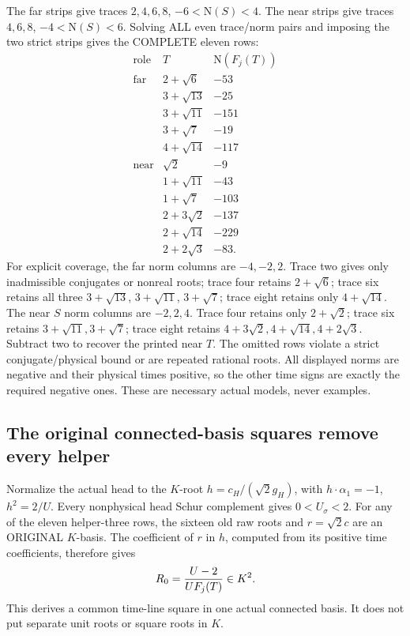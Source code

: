 The far strips give traces \(2,4,6,8\),
\(-6<\mathrm N(S)<4\).
The near strips give traces \(4,6,8\),
\(-4<\mathrm N(S)<6\).
Solving ALL even trace/norm pairs and imposing
the two strict strips gives the COMPLETE eleven rows:
\[
\begin{array}{c|c|r}
 \text{role}&T&\mathrm N(F_j(T))\\ \hline
 \text{far}&2+\sqrt6&-53\\
 &3+\sqrt{13}&-25\\
 &3+\sqrt{11}&-151\\
 &3+\sqrt7&-19\\
 &4+\sqrt{14}&-117\\ \hline
 \text{near}&\sqrt2&-9\\
 &1+\sqrt{11}&-43\\
 &1+\sqrt7&-103\\
 &2+3\sqrt2&-137\\
 &2+\sqrt{14}&-229\\
 &2+2\sqrt3&-83 .
\end{array}
\]
For explicit coverage, the far norm columns are
\(-4,-2,2\).
Trace two gives only inadmissible conjugates or
nonreal roots; trace four retains \(2+\sqrt6\);
trace six retains all three \(3+\sqrt{13}\),
\(3+\sqrt{11}\), \(3+\sqrt7\);
trace eight retains only \(4+\sqrt{14}\).
The near \(S\) norm columns are \(-2,2,4\).
Trace four retains only \(2+\sqrt2\);
trace six retains \(3+\sqrt{11},3+\sqrt7\);
trace eight retains \(4+3\sqrt2,4+\sqrt{14},4+2\sqrt3\).
Subtract two to recover the printed near \(T\).
The omitted rows violate a strict conjugate/physical
bound or are repeated rational roots.
All displayed norms are negative and their physical
times positive, so the other time signs are exactly
the required negative ones.
These are necessary actual models, never examples.

\subsection{The original connected-basis squares remove every helper}
\label{app:arithB16helpersquares}

Normalize the actual head to the \(K\)-root
\(h=c_H/(\sqrt2g_H)\), with
\(h\cdot\alpha_1=-1\), \(h^2=2/U\).
Every nonphysical head Schur complement gives
\(0<U_\sigma<2\).
For any of the eleven helper-three rows, the
sixteen old raw roots and \(r=\sqrt2c\) are an
ORIGINAL \(K\)-basis.
The coefficient of \(r\) in \(h\), computed from
its positive time coefficients, therefore gives
\[
                      R_0={U-2\over U F_j(T)}\in K^2 .
\]
This derives a common time-line square in one
actual connected basis.  It does not put separate
unit roots or square roots in \(K\).

